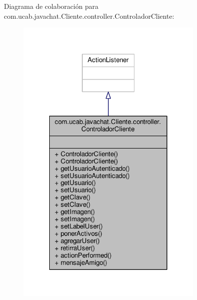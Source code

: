 Diagrama de colaboración para com.\-ucab.\-javachat.\-Cliente.\-controller.\-Controlador\-Cliente\-:\nopagebreak
\begin{figure}[H]
\begin{center}
\leavevmode
\includegraphics[width=258pt]{classcom_1_1ucab_1_1javachat_1_1_cliente_1_1controller_1_1_controlador_cliente__coll__graph}
\end{center}
\end{figure}
